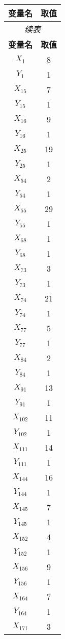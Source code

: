 \documentclass[a4paper,10pt]{article}
\begin{document}
\begin{center}
\begin{longtable}{cc}
\toprule
\textbf{变量名} & \textbf{取值} \\
\midrule
\endfirsthead
\multicolumn{2}{c}{\textit{续表}} \\
\toprule
\textbf{变量名} & \textbf{取值} \\
\midrule
\endhead
\bottomrule
\endfoot
\bottomrule
\endlastfoot
$X_{1}$ & 8 \\
$Y_{1}$ & 1 \\
$X_{15}$ & 7 \\
$Y_{15}$ & 1 \\
$X_{16}$ & 9 \\
$Y_{16}$ & 1 \\
$X_{25}$ & 19 \\
$Y_{25}$ & 1 \\
$X_{54}$ & 2 \\
$Y_{54}$ & 1 \\
$X_{55}$ & 29 \\
$Y_{55}$ & 1 \\
$X_{68}$ & 1 \\
$Y_{68}$ & 1 \\
$X_{73}$ & 3 \\
$Y_{73}$ & 1 \\
$X_{74}$ & 21 \\
$Y_{74}$ & 1 \\
$X_{77}$ & 5 \\
$Y_{77}$ & 1 \\
$X_{84}$ & 2 \\
$Y_{84}$ & 1 \\
$X_{91}$ & 13 \\
$Y_{91}$ & 1 \\
$X_{102}$ & 11 \\
$Y_{102}$ & 1 \\
$X_{111}$ & 14 \\
$Y_{111}$ & 1 \\
$X_{144}$ & 16 \\
$Y_{144}$ & 1 \\
$X_{145}$ & 7 \\
$Y_{145}$ & 1 \\
$X_{152}$ & 4 \\
$Y_{152}$ & 1 \\
$X_{156}$ & 9 \\
$Y_{156}$ & 1 \\
$X_{164}$ & 7 \\
$Y_{164}$ & 1 \\
$X_{171}$ & 3 \\

\end{longtable}
\end{center}
\end{document}
